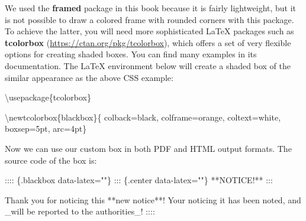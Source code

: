\documentclass[
  11pt,
]{krantz}
\newenvironment{Shaded}{\begin{snugshade}}{\end{snugshade}}
\newcommand{\BuiltInTok}[1]{#1}
\newcommand{\CommentTok}[1]{\textcolor[rgb]{0.37,0.37,0.37}{\textit{#1}}}
\newcommand{\ExtensionTok}[1]{#1}
\newcommand{\FunctionTok}[1]{\textcolor[rgb]{0,0,0}{#1}}
\newcommand{\KeywordTok}[1]{\textcolor[rgb]{0.27,0.27,0.27}{\textbf{#1}}}
\newcommand{\NormalTok}[1]{#1}
\begin{document}
\begin{Shaded}
\end{Shaded}

We used the \textbf{framed} package in this book because it is fairly lightweight, but it is not possible to draw a colored frame with rounded corners with this package. To achieve the latter, you will need more sophisticated LaTeX packages such as \textbf{tcolorbox} (\url{https://ctan.org/pkg/tcolorbox}), which offers a set of very flexible options for creating shaded boxes. You can find many examples in its documentation. The LaTeX environment below will create a shaded box of the similar appearance as the above CSS example:

\begin{Shaded}
\begin{Highlighting}[]
\BuiltInTok{\textbackslash{}usepackage}\NormalTok{\{}\ExtensionTok{tcolorbox}\NormalTok{\}}

\FunctionTok{\textbackslash{}newtcolorbox}\NormalTok{\{blackbox\}\{}
\NormalTok{  colback=black,}
\NormalTok{  colframe=orange,}
\NormalTok{  coltext=white,}
\NormalTok{  boxsep=5pt,}
\NormalTok{  arc=4pt\}}
\end{Highlighting}
\end{Shaded}

Now we can use our custom box in both PDF and HTML output formats. The source code of the box is:

\begin{Shaded}
\begin{Highlighting}[]
\NormalTok{:::: \{.blackbox data-latex=""\}}
\NormalTok{::: \{.center data-latex=""\}}
\NormalTok{**NOTICE!**}
\NormalTok{:::}

\NormalTok{Thank you for noticing this **new notice**! Your noticing it has}
\NormalTok{been noted, and _will be reported to the authorities_!}
\NormalTok{::::}
\end{Highlighting}
\end{Shaded}
\end{document}
